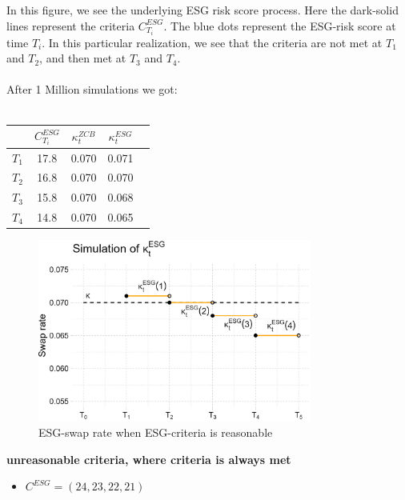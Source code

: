 In this figure, we see the underlying ESG risk score process. Here the dark-solid lines represent the criteria $C_{T_{i}}^{ESG}$. The blue dots represent the ESG-risk score at time $T_{i}$.
In this particular realization, we see that the criteria are not met at $T_{1}$ and $T_{2}$, and then met at $T_{3}$ and $T_{4}$. 
\\~\\ 
After 1 Million simulations we got:
\\~\\
\begin{center}
\begin{tabular}{lcccl}
\toprule
           &$C_{T_{i}}^{ESG}$ & $\kappa_{t}^{ZCB}$  & $\kappa_{t}^{ESG}$ \\
\midrule
$T_{1}$ &  17.8 & 0.070 & 0.071 \\
$T_{2}$ &  16.8 & 0.070 & 0.070 \\
$T_{3}$ &  15.8 & 0.070 & 0.068 \\
$T_{4}$ &  14.8 & 0.070 & 0.065 \\
\bottomrule
\end{tabular}
\end{center}

\begin{figure}[htp]
    \centering
    \includegraphics[width= 9cm]{figures/ESG/kappa_t_ESG_1.png}
    \caption{ESG-swap rate when ESG-criteria is reasonable}
    \label{fig: ESG_swap_1}
\end{figure}

\newpage 
\textbf{unreasonable criteria, where criteria is always met}
\begin{itemize}
    \item $C^{ESG} = (24,23,22,21)$
\end{itemize}


